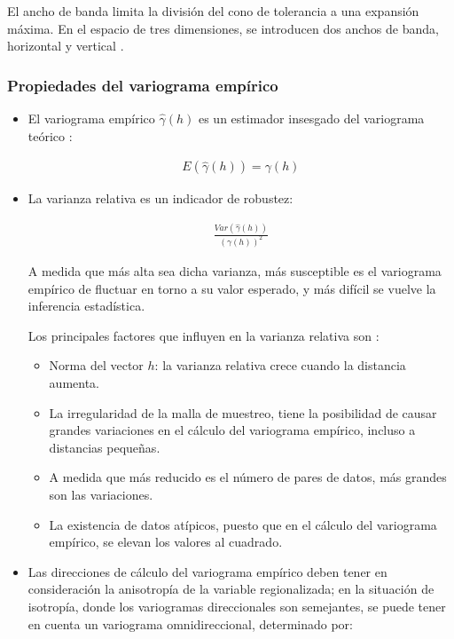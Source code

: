\documentclass[
]{book}
\providecommand{\tightlist}{%
  \setlength{\itemsep}{0pt}\setlength{\parskip}{0pt}}
\begin{document}
El ancho de banda limita la división del cono de tolerancia a una expansión máxima. En el espacio de tres dimensiones, se introducen dos anchos de banda, horizontal y vertical \citep{emery}.

\hypertarget{propiedades-del-variograma-empuxedrico}{%
\subsubsection*{Propiedades del variograma empírico}\label{propiedades-del-variograma-empuxedrico}}

\begin{itemize}
\item
  El variograma empírico \(\hat{\gamma}(h)\) es un estimador insesgado del variograma teórico \citep{montero}:

  \begin{align*}
      E(\hat{\gamma}(h))=\gamma(h)  
    \end{align*}
\item
  La varianza relativa es un indicador de robustez:

  \begin{align*}
      \frac{Var(\hat{\gamma}(h))}{(\gamma(h))^2}  
    \end{align*}

  A medida que más alta sea dicha varianza, más susceptible es el variograma empírico de fluctuar en torno a su valor esperado, y más difícil se vuelve la inferencia estadística.

  Los principales factores que influyen en la varianza relativa son \citep{emery}:

  \begin{itemize}
  \tightlist
  \item
    Norma del vector \(h\): la varianza relativa crece cuando la distancia aumenta.
  \item
    La irregularidad de la malla de muestreo, tiene la posibilidad de causar grandes variaciones en el cálculo del variograma empírico, incluso a distancias pequeñas.
  \item
    A medida que más reducido es el número de pares de datos, más grandes son las variaciones.
  \item
    La existencia de datos atípicos, puesto que en el cálculo del variograma empírico, se elevan los valores al cuadrado.
  \end{itemize}
\item
  Las direcciones de cálculo del variograma empírico deben tener en consideración la anisotropía de la variable regionalizada; en la situación de isotropía, donde los variogramas direccionales son semejantes, se puede tener en cuenta un variograma omnidireccional, determinado por:


\end{itemize}
\end{document}
